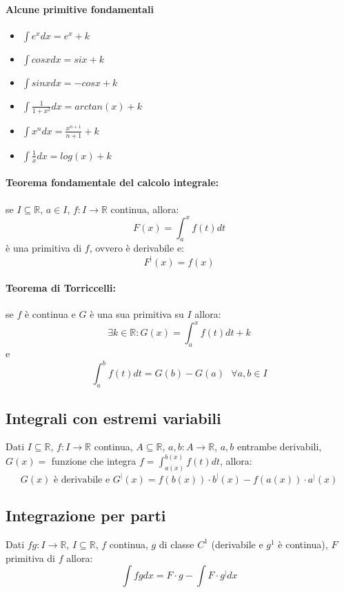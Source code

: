 \documentclass[12pt,a4paper]{article}
\begin{document}
\paragraph{Alcune primitive fondamentali}
\begin{itemize}
  \item $\int e^x dx = e^x + k$
  \item $\int cosx dx = six + k$
  \item $\int sinx dx = -cosx + k$
  \item $\int \frac{1}{1+x^2} dx = arctan(x) + k$
  \item $\int x^n dx = \frac{x^{n+1}}{n+1} + k$
  \item $\int \frac{1}{x} dx = log(x) + k$
\end{itemize}
\paragraph{Teorema fondamentale del calcolo integrale: } se $I \subseteq \mathbb{R}$, $a \in I$, $f:I \rightarrow \mathbb{R}$ continua, allora:
\[
F(x) = \int_{a}^{x} f(t) dt
\]
è una primitiva di $f$, ovvero è derivabile e:
\[
F^|(x) = f(x)
\]
\paragraph{Teorema di Torriccelli: } se $f$ è continua e $G$ è una sua primitiva su $I$ allora:
\[
\exists k \in \mathbb{R} : G(x) = \int_{a}^{x} f(t) dt + k
\]
e
\[
\int_{a}^{b} f(t) dt = G(b) - G(a) \text{ } \forall a,b \in I
\]
\subsection{Integrali con estremi variabili}
Dati $I \subseteq \mathbb{R}$, $f:I \rightarrow \mathbb{R}$ continua, $A \subseteq \mathbb{R}$, $a,b:A \rightarrow \mathbb{R}$, $a,b$ entrambe derivabili, $G(x) = $ funzione che integra $f = \int_{a(x)}^{b(x)} f(t) dt$, allora:
\[
G(x) \text{ è derivabile e } G^|(x) = f(b(x)) \cdot b^|(x) - f(a(x)) \cdot a^|(x)
\]  
\subsection{Integrazione per parti}
Dati $fg: I \rightarrow \mathbb{R}$, $I \subseteq \mathbb{R}$, $f$ continua, $g$ di classe $C^1$ (derivabile e $g^1$ è continua), $F$ primitiva di $f$ allora:
\[
\int fg dx = F \cdot g - \int F \cdot g^| dx
\]
\end{document}
